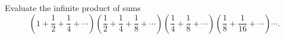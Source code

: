 Evaluate the infinite product of sums
\[\left(1+\dfrac12+\dfrac14+\cdots\right)\left(\dfrac12+\dfrac14+\dfrac18+\cdots\right)\left(\dfrac14+\dfrac18+\cdots\right)\left(\dfrac18+\dfrac1{16}+\cdots\right)\cdots.\]
